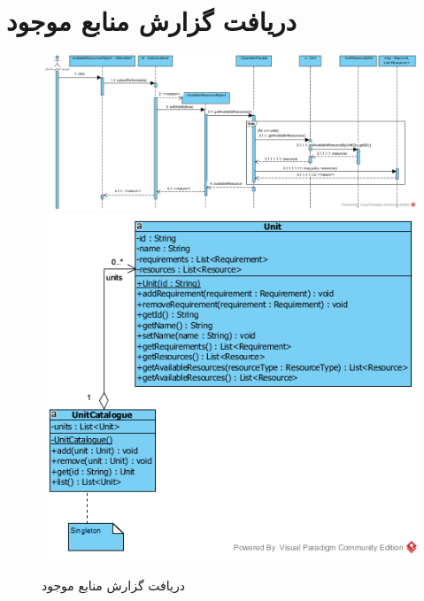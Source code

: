 \section{دریافت گزارش منابع موجود}
\begin{figure}[H]
	\centering
	\includegraphics[scale=0.6]{img/sequence-design/AvailableResourcesReport}
	\includegraphics[scale=0.7]{img/sequence-design/AvailableResourcesReportC}
	\caption{دریافت گزارش منابع موجود}
\end{figure}


